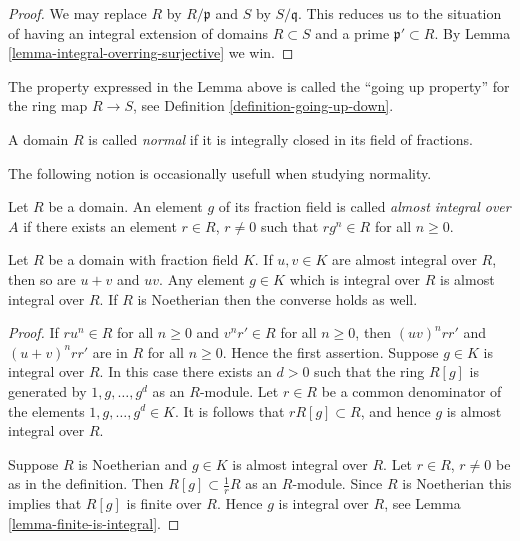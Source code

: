 \begin{proof}
We may replace $R$ by $R/\mathfrak p$ and $S$ by $S/\mathfrak q$.
This reduces us to the situation of having an integral
extension of domains $R \subset S$ and a prime $\mathfrak p' \subset R$.
By Lemma \ref{lemma-integral-overring-surjective} we win.
\end{proof}

\noindent
The property expressed in the Lemma above is called
the ``going up property'' for the ring map $R \to S$,
see Definition \ref{definition-going-up-down}.

\begin{definition}
\label{definition-ring-normal}
A domain $R$ is called {\it normal} if it is integrally
closed in its field of fractions.
\end{definition}

\noindent
The following notion is occasionally usefull when
studying normality.

\begin{definition}
\label{definition-almost-integral}
Let $R$ be a domain. An element $g$ of its fraction
field is called {\it almost integral over $A$}
if there exists an element $r \in R$, $r\not = 0$
such that $rg^n \in R$ for all $n \geq 0$.
\end{definition}

\begin{lemma}
\label{lemma-almost-integral}
Let $R$ be a domain with fraction field $K$.
If $u, v \in K$ are almost integral over $R$, then so are
$u + v$ and $uv$. Any element $g \in K$ which is integral over $R$
is almost integral over $R$. If $R$ is Noetherian
then the converse holds as well.
\end{lemma}

\begin{proof}
If $ru^n \in R$ for all $n \geq 0$ and
$v^nr' \in R$ for all $n \geq 0$, then
$(uv)^nrr'$ and $(u + v)^nrr'$ are in $R$ for
all $n \geq 0$. Hence the first assertion.
Suppose $g \in K$ is integral over $R$.
In this case there exists an $d > 0$ such that
the ring $R[g]$ is generated by $1, g, \ldots, g^d$ as an $R$-module.
Let $r \in R$ be a common denominator of the elements
$1, g, \ldots, g^d \in K$. It is follows that $rR[g] \subset R$,
and hence $g$ is almost integral over $R$.

\medskip\noindent
Suppose $R$ is Noetherian and $g \in K$ is almost integral over $R$.
Let $r \in R$, $r\not= 0$ be as in the definition.
Then $R[g] \subset \frac{1}{r}R$ as an $R$-module.
Since $R$ is Noetherian this implies that $R[g]$ is
finite over $R$. Hence $g$ is integral over $R$, see
Lemma \ref{lemma-finite-is-integral}.
\end{proof}

